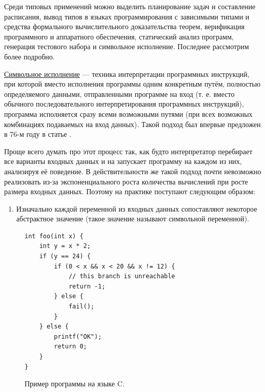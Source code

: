 Среди типовых применений можно выделить планирование задач и составление расписания, вывод типов в языках программирования с зависимыми типами и средства формального вычислительного доказательства теорем, верификация программного и аппаратного обеспечения, статический анализ программ, генерация тестового набора и символьное исполнение. Последнее рассмотрим более подробно.


\underline{Символьное исполнение} --- техника интерпретации программных инструкций, при которой вместо исполнения программы одним конкретным путём, полностью определяемого данными, отправленными программе на вход (т. е. вместо обычного последовательного интерпретирования программных инструкций), программа исполняется сразу всеми возможными путями (при всех возможных комбинациях подаваемых на вход данных). Такой подход был впервые предложен в 76-м году в статье \cite{symbex-intro-paper}.

Проще всего думать про этот процесс так, как будто интерпретатор перебирает все варианты входных данных и на запускает программу на каждом из них, анализируя её поведение. В действительности же такой подход почти невозможно реализовать из-за экспоненциального роста количества вычислений при росте размера входных данных. Поэтому на практике поступают следующим образом:

\begin{enumerate}
    \item Изначально каждой переменной из входных данных сопоставляют некоторое абстрактное значение (такое значение называют символьной переменной).
\end{enumerate}


\begin{figure}[ht]
\begin{center}
\begin{minipage}{0.5\textwidth}
\begin{verbatim}
int foo(int x) {
    int y = x * 2;
    if (y == 24) {
        if (0 < x && x < 20 && x != 12) {
            // this branch is unreachable
            return -1;
        } else {
            fail();
        }
    } else {
        printf("OK");
        return 0;
    }
}
\end{verbatim}
\caption{\label{symbex-example} Пример программы на языке C.}
\end{minipage}
\end{center}
\end{figure}

